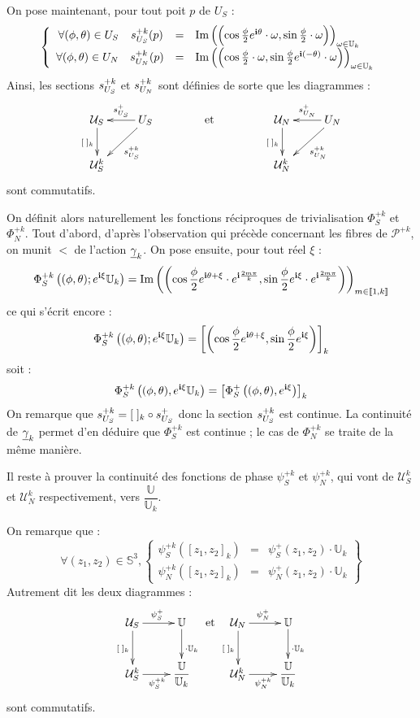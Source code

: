 \par
On pose maintenant, pour tout poit $p$ de $U_S$ : 
\[%
\left\{\begin{array}{rccl}%
\forall (\phi,\theta )\in U_S&\se{S}{+k}(p)&=&\pl{\cos\frac{\phi}{2}\ec{\theta}}{\sin\frac{\phi}{2}}\\%
\forall (\phi,\theta )\in U_N&\se{N}{+k}(p)&=&\pl{\cos\frac{\phi}{2}}{\sin\frac{\phi}{2}\ec{(-\theta )}}%
\end{array}\right.%
\]
Ainsi, les sections $s_{U_{S}}^{+k}$ et $s_{U_{N}}^{+k}$ sont d\'efinies de sorte que les diagrammes :
\[%
\xymatrix{%
\mathcal{U}_S\ar[d]_{[\; ]_k}&U_S\ar[l]_{\se{S}{+}}\ar[ld]^{\se{S}{+k}}\\%
\mathcal{U}_S^k&%
}%
\text{\hspace{1.5cm}et\hspace{1.5cm}}%
\xymatrix{%
\mathcal{U}_N\ar[d]_{[\; ]_k}&U_N\ar[l]_{\se{N}{+}}\ar[ld]^{\se{N}{+k}}\\%
\mathcal{U}_N^k&%
}%
\]
sont commutatifs.

\par
On d\'efinit alors naturellement les fonctions r\'eciproques de trivialisation $\Phi_S^{+k}$ et $\Phi_N^{+k}$. %
Tout d'abord, d'apr\`es l'observation qui pr\'ec\`ede concernant les fibres de $\mathcal{P}^{+k}$, on munit $\lt$ de l'action $\underline{\gamma}_{k}$. %
On pose ensuite, pour tout r\'eel $\xi$ :
\[\Phi_S^{+k}\left((\phi,\theta);e^{\mathbf{i}\xi}\mathbb{U}_k\right)=\text{Im}\left(\left(\cos\frac{\phi}{2}e^{\mathbf{i}\theta+\xi}\cdot e^{\mathbf{i}\frac{2m\pi}{k}} ,\sin\frac{\phi}{2}e^{\mathbf{i}\xi}\cdot e^{\mathbf{i}\frac{2m\pi}{k}}\right)\right)_{m\in[\![1,k]\!]}\]
ce qui s'\'ecrit encore :
\[\Phi_S^{+k}\left((\phi,\theta);e^{\mathbf{i}\xi}\mathbb{U}_k\right)=\left[\left(\cos\dfrac{\phi}{2}e^{\mathbf{i}\theta+\xi},\sin\dfrac{\phi}{2}e^{\mathbf{i}\xi}\right)\right]_k\]
soit :
\[\Phi_S^{+k}\left((\phi,\theta),e^{\mathbf{i}\xi}\mathbb{U}_k\right)=\left[\Phi_S^+\left((\phi,\theta),e^{\mathbf{i}\xi}\right)\right]_k\]
On remarque que $s_{U_{S}}^{+k}=[\; ]_k\circ s_{U_{S}}^{+}$ donc la section $s_{U_{S}}^{+k}$ est continue. %
La continuit\'e de $\underline{\gamma}_{k}$ permet d'en d\'eduire que $\Phi_S^{+k}$ est continue ; le cas de $\Phi_N^{+k}$ se traite de la m\^eme mani\`ere.

\par
Il reste \`a prouver la continuit\'e des fonctions de phase $\psi_S^{+k}$ et $\psi_N^{+k}$, %
qui vont de $\mathcal{U}_S^k$ et $\mathcal{U}_N^k$ respectivement, vers $\dfrac{\mathbb{U}}{\mathbb{U}_k}$.

\par
On remarque que : \[\forall (z_1,z_2)\in\mathbb{S}^3 , %
\left\{\begin{array}{lcr}%
\psi_S^{+k}\left(\left[z_1,z_2\right]_k\right)&=&\psi_S^+(z_1,z_2)\cdot\mathbb{U}_k\\%
\psi_N^{+k}\left(\left[z_1,z_2\right]_k\right)&=&\psi_N^+(z_1,z_2)\cdot\mathbb{U}_k%
\end{array}\right\}\]
Autrement dit les deux diagrammes :
\[%
\xymatrix{\mathcal{U}_S\ar[d]_{[\; ]_k}\ar[r]^{\psi_S^+}&\mathbb{U}\ar[d]^{\cdot\mathbb{U}_k}\\%
\mathcal{U}_S^k\ar[r]_{\psi_S^{+k}}&\dfrac{\mathbb{U}}{\mathbb{U}_k}%
}%
\text{ et }%
\xymatrix{\mathcal{U}_N\ar[d]_{[\; ]_k}\ar[r]^{\psi_N^+}&\mathbb{U}\ar[d]^{\cdot\mathbb{U}_k}\\%
\mathcal{U}_N^k\ar[r]_{\psi_N^{+k}}&\dfrac{\mathbb{U}}{\mathbb{U}_k}%
}%
\]
sont commutatifs.

